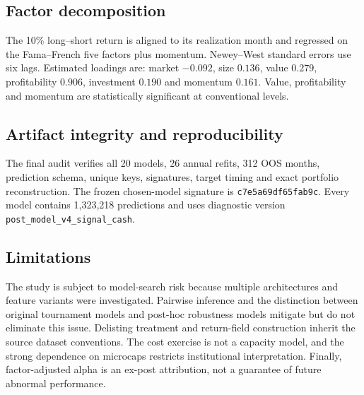 \documentclass[11pt,a4paper]{article}
\begin{document}
\subsection{Factor decomposition}
The 10\% long--short return is aligned to its realization month and regressed on the Fama--French five factors plus momentum. Newey--West standard errors use six lags. Estimated loadings are: market $-0.092$, size $0.136$, value $0.279$, profitability $0.906$, investment $0.190$ and momentum $0.161$. Value, profitability and momentum are statistically significant at conventional levels.

\subsection{Artifact integrity and reproducibility}
The final audit verifies all 20 models, 26 annual refits, 312 OOS months, prediction schema, unique keys, signatures, target timing and exact portfolio reconstruction. The frozen chosen-model signature is \texttt{c7e5a69df65fab9c}. Every model contains 1,323,218 predictions and uses diagnostic version \texttt{post\_model\_v4\_signal\_cash}.

\subsection{Limitations}
The study is subject to model-search risk because multiple architectures and feature variants were investigated. Pairwise inference and the distinction between original tournament models and post-hoc robustness models mitigate but do not eliminate this issue. Delisting treatment and return-field construction inherit the source dataset conventions. The cost exercise is not a capacity model, and the strong dependence on microcaps restricts institutional interpretation. Finally, factor-adjusted alpha is an ex-post attribution, not a guarantee of future abnormal performance.



\end{document}
